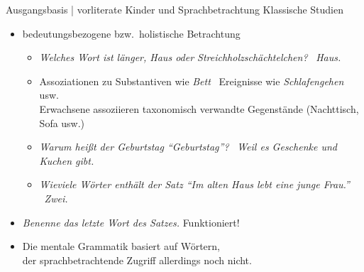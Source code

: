 \begin{frame}
  {Ausgangsbasis | vorliterate Kinder und Sprachbetrachtung}
  \onslide<+->
  \onslide<+->
  Klassische Studien \\
  \Halbzeile
  \onslide<+->
  \begin{itemize}[<+->]
    \item \alert{bedeutungsbezogene} bzw.\ \alert{holistische} Betrachtung
      \Viertelzeile
      \begin{itemize}
        \item \textit{Welches Wort ist länger, Haus oder Streichholzschächtelchen?} \ \textit{Haus.}
          \Viertelzeile
        \item Assoziationen zu Substantiven wie \textit{Bett} \ \alert{Ereignisse} wie \textit{Schlafengehen} usw.\\
          Erwachsene assoziieren \alert{taxonomisch verwandte Gegenstände} (Nachttisch, Sofa usw.)
          \Viertelzeile
        \item \textit{Warum heißt der Geburtstag  "`Geburtstag"'?} \ \textit{Weil es Geschenke und Kuchen gibt.}
          \Viertelzeile
        \item \textit{Wieviele Wörter enthält der Satz "`Im alten Haus lebt eine junge Frau."'} \ \textit{Zwei.}
      \end{itemize}
      \Halbzeile
    \item \textit{Benenne das letzte Wort des Satzes.}  Funktioniert!
      \Halbzeile
    \item[\ding{222}] Die mentale Grammatik basiert auf Wörtern,\\
      der sprachbetrachtende Zugriff allerdings noch nicht.
  \end{itemize}
\end{frame}

